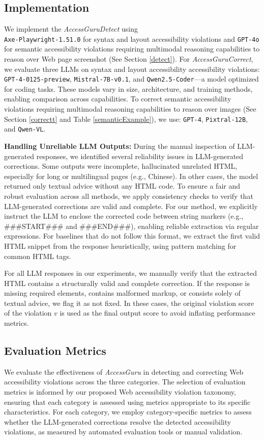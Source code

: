 \documentclass[sigconf, nonacm]{acmart}
\newcommand{\method}{\emph{AccessGuru}}
\begin{document}
\subsection{Implementation}
We implement the \method \emph{Detect} using \\ \texttt{Axe-Playwright-1.51.0} for syntax and layout accessibility violations and \texttt{GPT-4o} for semantic accessibility violations requiring multimodal reasoning capabilities to reason over Web page screenshot (See Section \ref{detect}).
For \method \emph{Correct}, we evaluate three LLMs on syntax and layout accessibility accessibility violations: \texttt{GPT-4-0125-preview}, \texttt{Mistral-7B-v0.1}, and \texttt{Qwen2.5-Coder}—a model optimized for coding tasks. These models vary in size, architecture, and training methods, enabling comparison across capabilities. 
To correct semantic accessibility violations requiring multimodal reasoning capabilities to reason over images (See Section \ref{correctt} and Table \ref{semanticExample}), we use: \texttt{GPT-4}, \texttt{Pixtral-12B}, and \texttt{Qwen-VL}.

\textbf{Handling Unreliable LLM Outputs:} During the manual inspection of LLM-generated responses, we identified several reliability issues in LLM-generated corrections. Some outputs were incomplete, hallucinated unrelated HTML, especially for long or multilingual pages (e.g., Chinese). In other cases, the model returned only textual advice without any HTML code. To ensure a fair and robust evaluation across all methods, we apply consistency checks to verify that LLM-generated corrections are valid and complete. For our method, we explicitly instruct the LLM to enclose the corrected code between string markers (e.g., \#\#\#START\#\#\# and \#\#\#END\#\#\#), enabling reliable extraction via regular expressions. For baselines that do not follow this format, we extract the first valid HTML snippet from the response heuristically, using pattern matching for common HTML tags.

For all LLM responses in our experiments, we manually verify that the extracted HTML contains a structurally valid and complete correction. If the response is missing required elements, contains malformed markup, or consists solely of textual advice, we flag it as not fixed. In these cases, the original violation score of the violation $v$ is used as the final output score to avoid inflating performance metrics.
\subsection{Evaluation Metrics}
We evaluate the effectiveness of \method{} in detecting and correcting Web accessibility violations across the three categories. The selection of evaluation metrics is informed by our proposed Web accessibility violation taxonomy, ensuring that each category is assessed using metrics appropriate to its specific characteristics. For each category, we employ category-specific metrics to assess whether the LLM-generated corrections resolve the detected accessibility violations, as measured by automated evaluation tools or manual validation.
\end{document}
